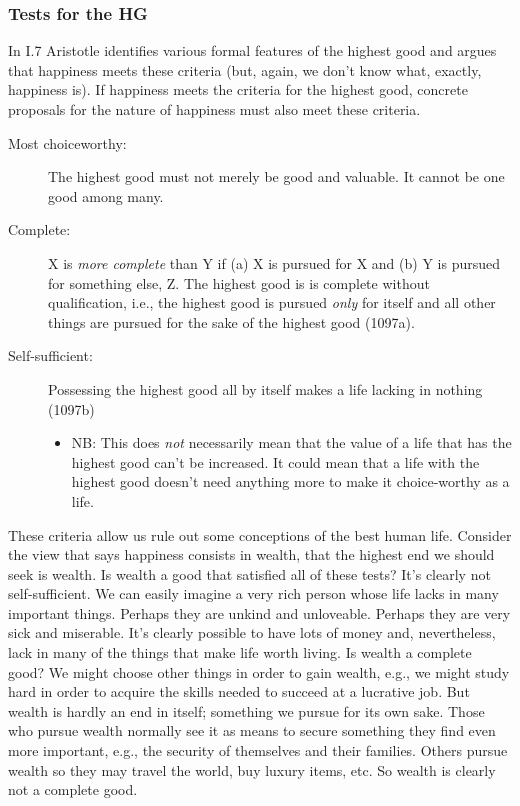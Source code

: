 \documentclass[oneside]{article}
\begin{document}
\subsubsection*{Tests for the HG }

In I.7 Aristotle identifies various formal features of the highest good and argues that happiness meets these criteria (but, again, we don't know what, exactly, happiness is). If happiness meets the criteria for the highest good, concrete proposals for the nature of happiness must also meet these criteria. 

\begin{description}
\item[Most choiceworthy:] The highest good must not merely be good and valuable. It cannot be one good among many.
\item[Complete:]  X is \emph{more complete} than Y if (a) X is pursued for X and (b) Y is pursued for something else, Z. The highest good is is complete without qualification, i.e., the highest good is pursued \emph{only} for itself and all other things are pursued for the sake of the highest good (1097a).
\item[Self-sufficient:] Possessing the highest good all by itself makes a life lacking in nothing (1097b)
\begin{itemize}
\item NB: This does \emph{not} necessarily mean that the value of a life that has the highest good can't be increased. It could mean that a life with the highest good doesn't need anything more to make it choice-worthy as a life.
\end{itemize}
\end{description}

These criteria allow us rule out some conceptions of the best human life. Consider the view that says happiness consists in wealth, that the highest end we should seek is wealth. Is wealth a good that satisfied all of these tests? It's clearly not self-sufficient. We can easily imagine a very rich person whose life lacks in many important things. Perhaps they are unkind and unloveable. Perhaps they are very sick and miserable. It's clearly possible to have lots of money and, nevertheless, lack in many of the things that make life worth living. Is wealth a complete good? We might choose other things in order to gain wealth, e.g., we might study hard in order to acquire the skills needed to succeed at a lucrative job. But wealth is hardly an end in itself; something we pursue for its own sake. Those who pursue wealth normally see it as means to secure something they find even more important, e.g., the security of themselves and their families. Others pursue wealth so they may travel the world, buy luxury items, etc. So wealth is clearly not a complete good. 
\end{document}
